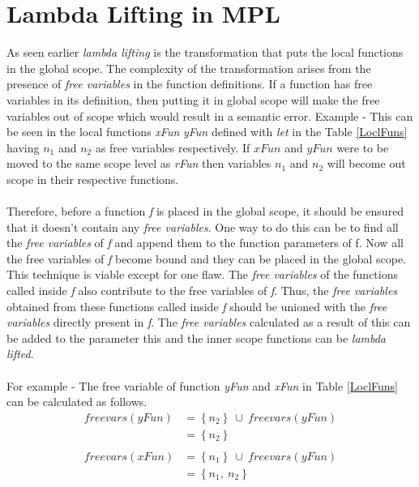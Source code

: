 \documentclass[11pt]{article}
\begin{document}
\section {Lambda Lifting in MPL}
As seen earlier {\em lambda lifting} is the transformation that puts the local functions in the global scope. The complexity of the transformation arises from the presence of {\em free variables} in the function definitions. If a function has free variables in its definition, then putting it in global scope will make the free variables out of scope which would result in a semantic error. Example - This can be seen in the local functions {\em xFun} {\em yFun} defined with {\em let} in the Table \ref{LoclFuns} having $n_1$ and $n_2$ as free variables respectively. If $xFun$ and $yFun$ were to be moved to the same scope level as {\em rFun} then variables $n_1$ and $n_2$ will become out scope in their respective functions.
~~\\~~\\ 
Therefore, before a function {\em f} is placed in the global scope, it should be ensured that it doesn't contain any {\em free variables}. One way to do this can be to find all the {\em free variables} of {\em f} and append them to the function parameters of f. Now all the free variables of {\em f} become bound and they can be placed in the global scope. This technique is viable except for one flaw. The {\em free variables} of the functions called inside {\em f} also contribute to the free variables of {\em f}. Thus, the {\em free variables} obtained from these functions called inside {\em f} should be unioned with the {\em free variables} directly present in {\em f}. The {\em free variables} calculated as a result of this can be added to the parameter this and the inner scope functions can be {\em lambda lifted}.
~~\\~~\\
For example - The free variable of function {\em yFun} and {\em xFun} in Table \ref {LoclFuns} can be calculated as follows.
\begin{align*}
free vars (yFun) &= \left\{n_2\right\}~\cup ~free vars (yFun) \\ 
                 &= \left\{n_2\right\} \\~~\\ 
free vars (xFun) &= \left\{n_1\right\}~\cup ~free vars (yFun) \\ 
                 &= \left\{n_1,~n_2\right\} \\ 
\end{align*}
\end{document}
